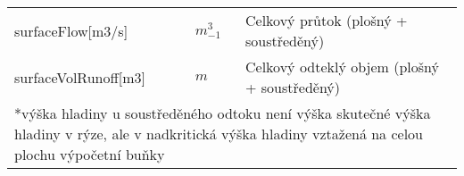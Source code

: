 \begin{table}[t]
\begin{tabular}{llp{}}
 surfaceFlow[m3/s]   &  $m^3_{-1}$ & Celkový průtok (plošný + soustředěný)  \\
 surfaceVolRunoff[m3]   &   $m$  & Celkový odteklý objem (plošný + soustředěný) \\
  \hline
   \hline
   \multicolumn{3}{p{\textwidth}}{*výška hladiny u soustředěného odtoku není výška skutečné výška hladiny v rýze, ale v nadkritická výška hladiny vztažená na celou plochu výpočetní buňky}
 \end{tabular}

\end{table}
